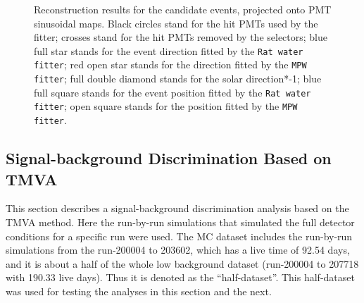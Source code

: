 \begin{figure}[htbp]
{\begin{minipage}[t]{0.4\textwidth}
		\end{minipage}
	}
	\caption[Reconstruction results for the candidate events, projected onto PMT sinusoidal maps.]{Reconstruction results for the candidate events, projected onto PMT sinusoidal maps. Black circles stand for
		the hit PMTs used by the fitter; crosses stand for the hit PMTs removed by the selectors; blue full star stands for the event direction fitted by the \texttt{Rat water fitter}; red open star stands for the direction fitted by the \texttt{MPW fitter}; full double diamond stands for the solar direction*-1; blue full square stands for the event position fitted by the \texttt{Rat water fitter}; open square stands for the position fitted by the \texttt{MPW fitter}.}
	\label{openDataSetCandidate}
\end{figure}


\subsection{Signal-background Discrimination Based on TMVA}\label{sect:tmva}
This section describes a signal-background discrimination analysis based on the TMVA method. Here the run-by-run simulations that simulated the full detector conditions for a specific run were used. The MC dataset includes the run-by-run simulations from the run-200004 to 203602, which has a live time of 92.54 days, and it is about a half of the whole low background dataset (run-200004 to 207718 with 190.33 live days). Thus it is denoted as the ``half-dataset''. This half-dataset was used for testing the analyses in this section and the next.


